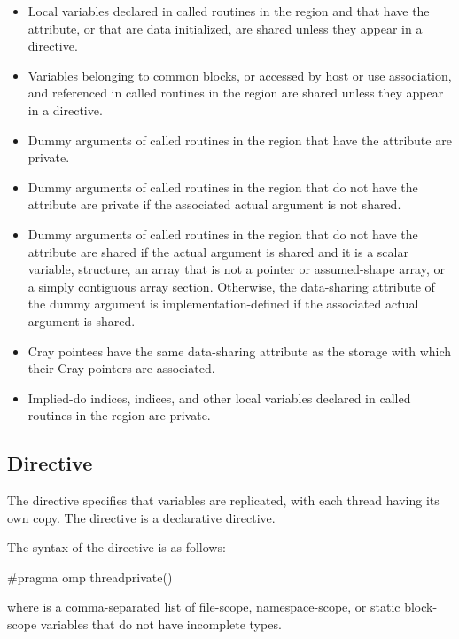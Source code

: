 \begin{fortranspecific}
\begin{itemize}
\item Local variables declared in called routines in the region and that have the 
       attribute, or that are data initialized, are shared unless they 
      appear in a  directive.
\item Variables belonging to common blocks, or accessed by host or use association, 
      and referenced in called routines in the region are shared unless they appear 
      in a  directive.
\item Dummy arguments of called routines in the region that have the
       attribute are private.
\item Dummy arguments of called routines in the region that do not have the
       attribute are private if the associated actual argument is not 
      shared.
\item Dummy arguments of called routines in the region that do not have the
       attribute are shared if the actual argument is shared and 
      it is a scalar variable, structure, an array that is not a pointer or
      assumed-shape array, or a simply contiguous array section.  Otherwise, the
      data-sharing attribute of the dummy argument is implementation-defined if
      the associated actual argument is shared.
\item Cray pointees have the same data-sharing attribute as the storage with 
      which their Cray pointers are associated.
\item Implied-do indices,  indices, and other local variables 
      declared in called routines in the region are private.
\end{itemize}
\end{fortranspecific}



\subsection{ Directive}
\label{subsec:threadprivate Directive}
\summary
The  directive specifies that variables are replicated, with 
each thread having its own copy. The  directive is a declarative 
directive.

\syntax
\begin{ccppspecific}
The syntax of the  directive is as follows:

\begin{ompcPragma}
#pragma omp threadprivate() 
\end{ompcPragma}

where  is a comma-separated list of file-scope, namespace-scope, or static
block-scope variables that do not have incomplete types.
\end{ccppspecific}

